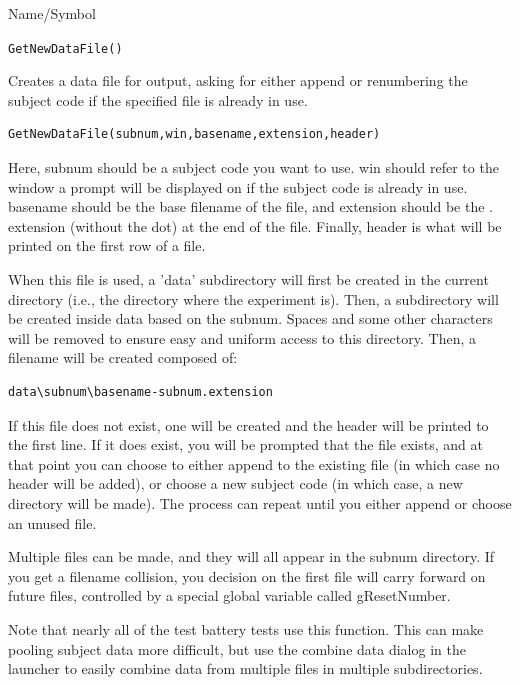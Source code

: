 \begin{desc}{Name/Symbol}
\item[Name/Symbol]	\verb+GetNewDataFile()+

\item[Description]	Creates a data file for output, asking for either append or renumbering the subject code if the specified file is already in use.

\item[Usage]
\begin{verbatim}
GetNewDataFile(subnum,win,basename,extension,header)
\end{verbatim} 
Here, subnum should be a subject code you want to use.  win should refer to the window a prompt will be displayed on if the subject code is already in use.  basename should be the base filename of the file, and extension should be the . extension (without the dot) at the end of the file.  Finally, header is what will be printed on the first row of a file.

When this file is used, a 'data' subdirectory will first be created in the current directory (i.e., the directory where the experiment is).  Then, a subdirectory will be created inside data based on the subnum.  Spaces and some other characters will be removed to ensure easy and uniform access to this directory.  Then, a filename will be created composed of:
\begin{verbatim}
data\subnum\basename-subnum.extension
\end{verbatim}

If this file does not exist, one will be created and the header will be printed to the first line.  If it does exist, you will be prompted that the file exists, and at that point you can choose to either append to the existing file (in which case no header will be added), or choose a new subject code (in which case, a new directory will be made).  The process can repeat until you either append or choose an unused file.

Multiple files can be made, and they will all appear in the subnum directory.  If you get a filename collision, you decision on the first file will carry forward on future files, controlled by a special global variable called gResetNumber.  


Note that nearly all of the test battery tests use this function.  This can make pooling subject data more difficult, but use the combine data dialog in the launcher to easily combine data from multiple files in multiple subdirectories.


\end{desc}
